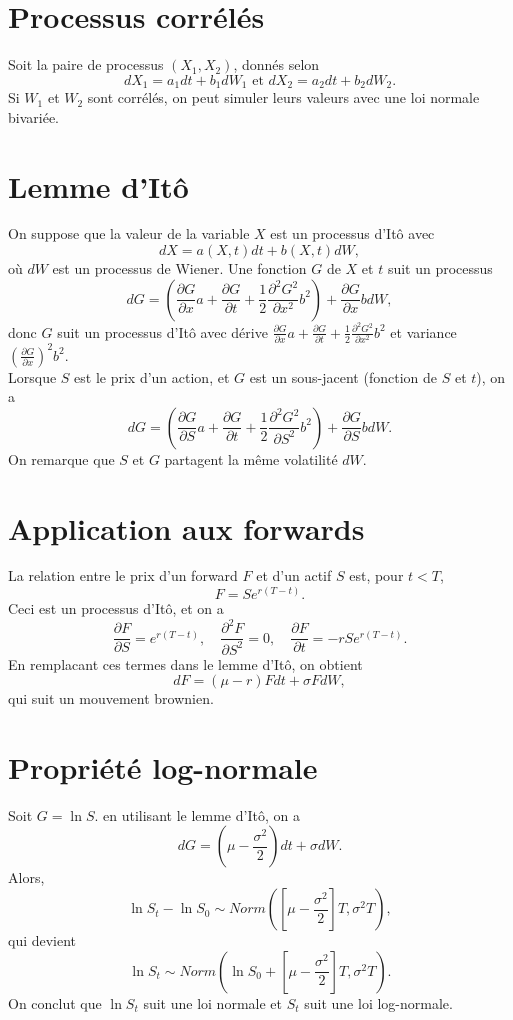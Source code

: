 \section{Processus corrélés}

Soit la paire de processus $(X_1, X_2)$, donnés selon
$$dX_1 = a_1 dt + b_1 dW_1 \text{  et  } dX_2 = a_2 dt + b_2 dW_2.$$
Si $W_1$ et $W_2$ sont corrélés, on peut simuler leurs valeurs avec une loi normale bivariée. 

\section{Lemme d'Itô}

On suppose que la valeur de la variable $X$ est un processus d'Itô avec 
$$dX = a(X, t) dt + b(X, t) dW,$$
où $dW$ est un processus de Wiener. Une fonction $G$ de $X$ et $t$ suit un processus
$$dG = \left(\frac{\partial G}{\partial x} a + \frac{\partial G}{\partial t} + \frac{1}{2} \frac{\partial^2 G^2}{\partial x^2}b^2\right) + \frac{\partial G}{\partial x} b dW,$$
donc $G$ suit un processus d'Itô avec dérive $\frac{\partial G}{\partial x} a + \frac{\partial G}{\partial t} + \frac{1}{2} \frac{\partial^2 G^2}{\partial x^2}b^2$ et variance $\left(\frac{\partial G}{\partial x}\right)^2 b^2.$\\

Lorsque $S$ est le prix d'un action, et $G$ est un sous-jacent (fonction de $S$ et $t$), on a
$$dG = \left(\frac{\partial G}{\partial S} a + \frac{\partial G}{\partial t} + \frac{1}{2} \frac{\partial^2 G^2}{\partial S^2}b^2\right) + \frac{\partial G}{\partial S} b dW.$$
On remarque que $S$ et $G$ partagent la même volatilité $dW$. 

\section{Application aux forwards}

La relation entre le prix d'un forward $F$ et d'un actif $S$ est, pour $t<T$, 
$$F = Se^{r(T-t)}.$$
Ceci est un processus d'Itô, et on a 
$$\frac{\partial F}{\partial S} = e^{r(T-t)}, \quad \frac{\partial^2 F}{\partial S^2} = 0, \quad \frac{\partial F}{\partial t} = -rSe^{r(T-t)}.$$
En remplacant ces termes dans le lemme d'Itô, on obtient
$$dF = (\mu - r) F dt + \sigma F dW,$$
qui suit un mouvement brownien. 

\section{Propriété log-normale}\label{sec:ln-prop}

Soit $G = \ln S$. en utilisant le lemme d'Itô, on a 
$$dG = \left(\mu - \frac{\sigma^2}{2}\right) dt + \sigma dW. $$
Alors, 
$$\ln S_t - \ln S_0 \sim Norm\left(\left[\mu - \frac{\sigma^2}{2}\right]T, \sigma^2 T\right),$$
qui devient
$$\ln S_t\sim Norm\left(\ln S_0 + \left[\mu - \frac{\sigma^2}{2}\right]T, \sigma^2 T\right).$$
On conclut que $\ln S_t$ suit une loi normale et $S_t$ suit une loi log-normale. 


